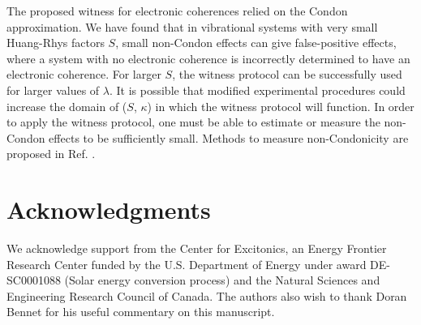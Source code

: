 The proposed witness for electronic coherences \cite{witness,allanWitness} relied on the Condon approximation. We have found that in vibrational systems with very small Huang-Rhys factors $S$, small non-Condon effects can give false-positive effects, where a system with no electronic coherence is incorrectly determined to have an electronic coherence. For larger $S$, the witness protocol can be successfully used for larger values of $\lambda$. It is possible that modified experimental procedures could increase the domain of ($S$, $\kappa$) in which the witness protocol will function. In order to apply the witness protocol, one must be able to estimate or measure the non-Condon effects to be sufficiently small. Methods to measure non-Condonicity are proposed in Ref. \cite{myDetectingNonCondonPaper}.




\section{Acknowledgments}
We acknowledge support from the Center for Excitonics, an Energy Frontier Research Center funded by the U.S. Department of Energy under award DE-SC0001088 (Solar energy conversion process) and the Natural Sciences and Engineering Research Council of Canada.  The authors also wish to thank Doran Bennet for his useful commentary on this manuscript.
